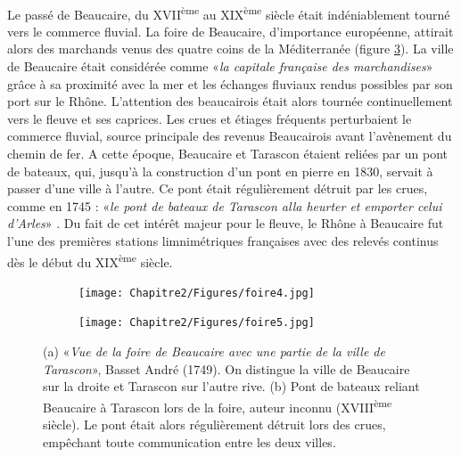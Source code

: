 \paragraph{} Le passé de Beaucaire, du XVII\textsuperscript{ème} au XIX\textsuperscript{ème} siècle était indéniablement tourné vers le commerce fluvial. La foire de Beaucaire, d'importance européenne, attirait alors des marchands venus des quatre coins de la Méditerranée (figure \ref{fig:foire}). La ville de Beaucaire était considérée comme «\textit{la capitale française des marchandises}» \citep{leon_vie_1953} grâce à sa proximité avec la mer et les échanges fluviaux rendus possibles par son port sur le Rhône. L'attention des beaucairois était alors tournée continuellement vers le fleuve et ses caprices. Les crues et étiages fréquents perturbaient le commerce fluvial, source principale des revenus Beaucairois avant l'avènement du chemin de fer. A cette époque, Beaucaire et Tarascon étaient reliées par un pont de bateaux, qui, jusqu'à la construction d'un pont en pierre en 1830, servait à passer d'une ville à l'autre. Ce pont était régulièrement détruit par les crues, comme en 1745 : «\textit{le pont de bateaux de Tarascon alla heurter et emporter celui d'Arles}» \citep{anibert_annales_1764}. Du fait de cet intérêt majeur pour le fleuve, le Rhône à Beaucaire fut l'une des premières stations limnimétriques françaises avec des relevés continus dès le début du XIX\textsuperscript{ème} siècle. 

\begin{figure}[h]
		\centering
            \begin{subfigure}{0.49\linewidth}
            \centering
            	\texttt{[image: Chapitre2/Figures/foire4.jpg]}\hfill
            	\caption{}
            	\label{subfig:foire1}
            \end{subfigure}
            \begin{subfigure}{0.49\linewidth}
            \centering
            	\texttt{[image: Chapitre2/Figures/foire5.jpg]}
            	\caption{}
           		\label{subfig:foire2}
            \end{subfigure}
\caption{(a) «\textit{Vue de la foire de Beaucaire avec une partie de la ville de Tarascon}», Basset André (1749). On distingue la ville de Beaucaire sur la droite et Tarascon sur l'autre rive. 
(b) Pont de bateaux reliant Beaucaire à Tarascon lors de la foire, auteur inconnu (XVIII\textsuperscript{ème} siècle). Le pont était alors régulièrement détruit lors des crues, empêchant toute communication entre les deux villes.}
\label{fig:foire}
\end{figure}

